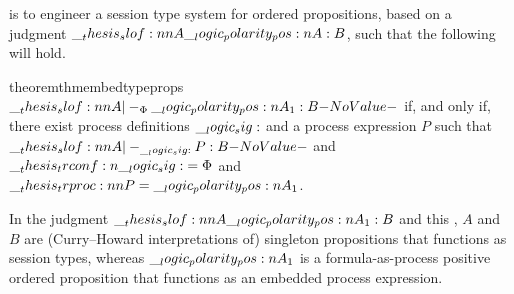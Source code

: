  is to engineer a session type system for ordered propositions, based on a judgment $\slof{A |- \p{A} : B}$, such that the following  will hold.
%
\begin{restatable}[
  label=thm:embed:type-props
]{theorem}{thmembedtypeprops}
  $\slof{A |-_{\orsig} \p{A}_1 : B}$ if, and only if, there exist process definitions $\__logic_sig:$ and a process expression $P$ such that $\slof{A |-_{\sig} P : B}$ and $\__thesis_trconf:n {\__logic_sig:} = \Phi$ and $\trproc{P} = \p{A}_1$.
\end{restatable}
%
\noindent
In the judgment $\slof{A |- \p{A}_1 : B}$ and this , $A$ and $B$ are (Curry--Howard interpretations of) singleton propositions that functions as session types, whereas $\__logic_polarity_pos:n {A}_1$ is a formula-as-process positive ordered proposition that functions as an embedded process expression.

